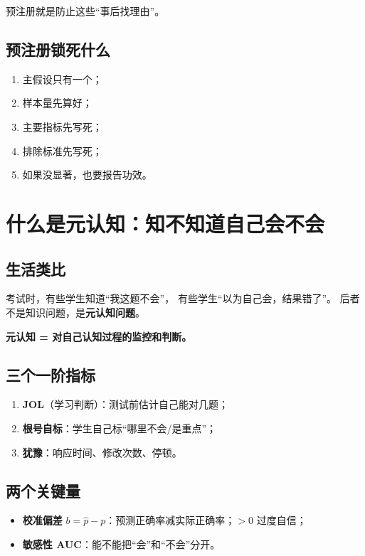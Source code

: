 \documentclass[UTF8,a4paper,11pt]{ctexart}
\begin{document}
预注册就是防止这些“事后找理由”。

\subsection{预注册锁死什么}

\begin{enumerate}[leftmargin=2em]
\item 主假设只有一个；
\item 样本量先算好；
\item 主要指标先写死；
\item 排除标准先写死；
\item 如果没显著，也要报告功效。
\end{enumerate}


\section{什么是元认知：知不知道自己会不会}

\subsection{生活类比}

考试时，有些学生知道“我这题不会”，
有些学生“以为自己会，结果错了”。
后者不是知识问题，是\textbf{元认知问题}。

\textbf{元认知 = 对自己认知过程的监控和判断。}

\subsection{三个一阶指标}

\begin{enumerate}[leftmargin=2em]
\item \textbf{JOL}（学习判断）：测试前估计自己能对几题；
\item \textbf{根号自标}：学生自己标“哪里不会/是重点”；
\item \textbf{犹豫}：响应时间、修改次数、停顿。
\end{enumerate}

\subsection{两个关键量}

\begin{itemize}[leftmargin=2em]
\item \textbf{校准偏差} $b=\hat p-p$：预测正确率减实际正确率；$>0$ 过度自信；
\item \textbf{敏感性 AUC}：能不能把“会”和“不会”分开。
\end{itemize}
\end{document}
